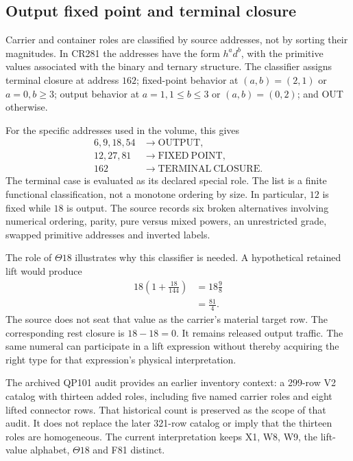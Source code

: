 \subsection{Output fixed point and terminal closure}

Carrier and container roles are classified by source addresses, not by sorting their magnitudes. In CR281 the addresses have the form $h^a d^b$, with the primitive values associated with the binary and ternary structure. The classifier assigns terminal closure at address $162$; fixed-point behavior at $(a,b)=(2,1)$ or $a=0,b\ge3$; output behavior at $a=1,1\le b\le3$ or $(a,b)=(0,2)$; and OUT otherwise.\cite{viireview}

For the specific addresses used in the volume, this gives
\begin{align}
6,9,18,54&\longrightarrow\mathrm{OUTPUT},\\
12,27,81&\longrightarrow\mathrm{FIXED\ POINT},\\
162&\longrightarrow\mathrm{TERMINAL\ CLOSURE}.
\end{align}
The terminal case is evaluated as its declared special role. The list is a finite functional classification, not a monotone ordering by size. In particular, $12$ is fixed while $18$ is output. The source records six broken alternatives involving numerical ordering, parity, pure versus mixed powers, an unrestricted grade, swapped primitive addresses and inverted labels.

The role of $\Theta18$ illustrates why this classifier is needed. A hypothetical retained lift would produce
\begin{align}
18\left(1+\frac{18}{144}\right)
&=18\frac98\\
&=\frac{81}{4}.
\end{align}
The source does not seat that value as the carrier's material target row. The corresponding rest closure is $18-18=0$. It remains released output traffic. The same numeral can participate in a lift expression without thereby acquiring the right type for that expression's physical interpretation.

The archived QP101 audit provides an earlier inventory context: a 299-row V2 catalog with thirteen added roles, including five named carrier roles and eight lifted connector rows. That historical count is preserved as the scope of that audit. It does not replace the later 321-row catalog or imply that the thirteen roles are homogeneous. The current interpretation keeps X1, W8, W9, the lift-value alphabet, $\Theta18$ and F81 distinct.

